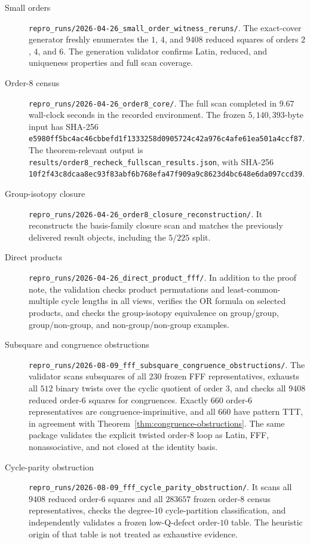 \begin{description}
\item[Small orders]
\nolinkurl{repro_runs/2026-04-26_small_order_witness_reruns/}.
The exact-cover generator freshly enumerates the $1$, $4$, and $9408$ reduced
squares of orders $2$, $4$, and $6$.  The generation validator confirms
Latin, reduced, and uniqueness properties and full scan coverage.

\item[Order-$8$ census]
\nolinkurl{repro_runs/2026-04-26_order8_core/}.
The full scan completed in $9.67$ wall-clock seconds in the recorded
environment.  The frozen $5{,}140{,}393$-byte input has SHA-256
\nolinkurl{e5980ff5bc4ac46cbbefd1f1333258d0905724c42a976c4afe61ea501a4ccf87}.
The theorem-relevant output is
\nolinkurl{results/order8_recheck_fullscan_results.json}, with SHA-256
\nolinkurl{10f2f43c8dcaa8ec93f83abf6b768efa47f909a9c8623d4bc648e6da097ccd39}.

\item[Group-isotopy closure]
\nolinkurl{repro_runs/2026-04-26_order8_closure_reconstruction/}.
It reconstructs the basis-family closure scan and matches the previously
delivered result objects, including the $5/225$ split.

\item[Direct products]
\nolinkurl{repro_runs/2026-04-26_direct_product_fff/}.
In addition to the proof note, the validation checks product permutations and
least-common-multiple cycle lengths in all views, verifies the OR formula on
selected products, and checks the group-isotopy equivalence on group/group,
group/non-group, and non-group/non-group examples.

\item[Subsquare and congruence obstructions]
\nolinkurl{repro_runs/2026-08-09_fff_subsquare_congruence_obstructions/}.
The validator scans subsquares of all $230$ frozen FFF representatives,
exhausts all $512$ binary twists over the cyclic quotient of order $3$, and
checks all $9408$ reduced order-$6$ squares for congruences.  Exactly $660$
order-$6$ representatives are congruence-imprimitive, and all $660$ have
pattern TTT, in agreement with Theorem~\ref{thm:congruence-obstructions}.
The same package validates the explicit twisted order-$8$ loop as Latin,
FFF, nonassociative, and not closed at the identity basis.

\item[Cycle-parity obstruction]
\nolinkurl{repro_runs/2026-08-09_fff_cycle_parity_obstruction/}.
It scans all $9408$ reduced order-$6$ squares and all $283657$ frozen
order-$8$ census representatives, checks the degree-$10$ cycle-partition
classification, and independently validates a frozen low-Q-defect order-$10$
table.  The heuristic origin of that table is not treated as exhaustive
evidence.


\end{description}
